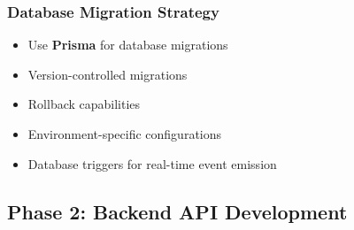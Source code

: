 \documentclass[11pt,a4paper]{article}
\begin{document}
\subsubsection{Database Migration Strategy}
\begin{itemize}
    \item Use \textbf{Prisma} for database migrations
    \item Version-controlled migrations
    \item Rollback capabilities
    \item Environment-specific configurations
    \item Database triggers for real-time event emission
\end{itemize}

\subsection{Phase 2: Backend API Development}
\end{document}
